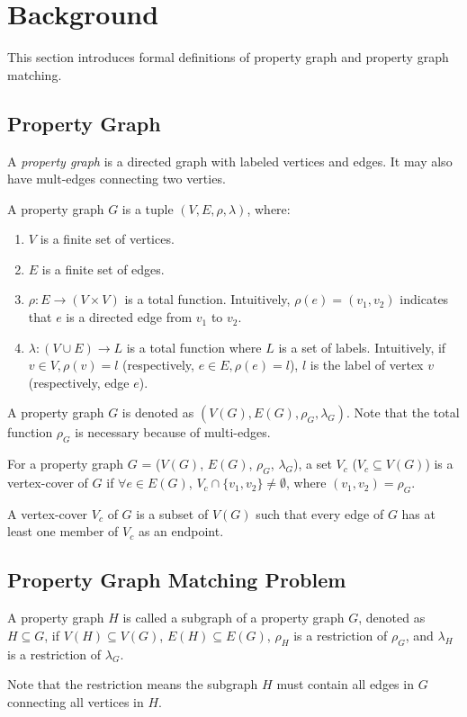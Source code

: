\section{Background}\label{sec:background}
This section introduces formal definitions of property graph and property graph matching.
\subsection{Property Graph}
A \emph{property graph} is a directed graph with labeled vertices and edges. It may also have mult-edges connecting two verties.

\begin{definition}
  A property graph $G$ is a tuple $(V, E, \rho, \lambda)$, where:
  \begin{enumerate}[noitemsep,label={(\arabic*)}]
  \item $V$ is a finite set of vertices.
  \item $E$ is a finite set of edges.
  \item $\rho: E \rightarrow (V \times V)$ is a total function.
    Intuitively, $\rho(e) = (v_1, v_2)$ indicates that $e$ is a directed edge from $v_1$ to $v_2$.
  \item $\lambda :(V \cup E) \rightarrow L$ is a total function where $L$ is a set of labels.
    Intuitively, if $v \in V, \rho(v) = l$ (respectively, $e \in E, \rho(e) = l$),
    $l$ is the label of vertex $v$ (respectively, edge $e$).
  \end{enumerate}
\end{definition}
A property graph $G$ is denoted as $(V(G), E(G), \rho_G, \lambda_G)$.
Note that the total function $\rho_G$ is necessary because of multi-edges.

\begin{definition}
  For a property graph $G$ = ($V(G)$, $E(G)$, $\rho_G$, $\lambda_G$), a set $V_c$ ($V_c \subseteq V(G)$) is a vertex-cover of $G$
  if $\forall e \in E(G)$, $V_c \cap \{ v_1, v_2 \} \ne \emptyset$, where $(v_1, v_2) = \rho_G$.
\end{definition}
A vertex-cover $V_c$ of $G$ is a subset of $V(G)$ such that every edge of $G$ has at least one member of $V_c$ as an endpoint.
\subsection{Property Graph Matching Problem}
\begin{definition}[Subgraph]
  A property graph $H$ is called a subgraph of a property graph $G$, denoted as $H \subseteq G$, if
  $V(H) \subseteq V(G)$, $E(H) \subseteq E(G)$, $\rho_H$ is a restriction of $\rho_G$, and $\lambda_H$ is a restriction of $\lambda_G$.
\end{definition}
Note that the restriction means the subgraph $H$ must contain all edges in $G$ connecting all vertices in $H$.

